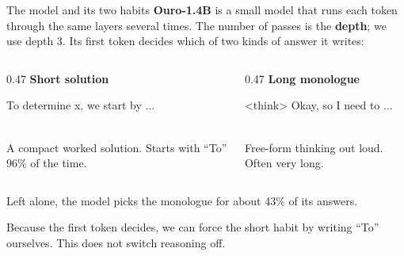 \documentclass[aspectratio=169,11pt]{beamer}
\newcommand{\takeaway}[1]{\par\vfill\begin{center}\colorbox{accent!8}{\parbox{0.9\textwidth}{\centering\small #1}}\end{center}\vspace{0.2em}}
\newcommand{\sample}[2]{%
  \colorbox{#1}{\parbox{0.9\linewidth}{\footnotesize\ttfamily #2}}}
\begin{document}
\begin{frame}{The model and its two habits}
  \small
  \textbf{Ouro-1.4B} is a small model that runs each token through the same layers several times.
  The number of passes is the \textbf{depth}; we use depth 3.
  Its first token decides which of two kinds of answer it writes:
  \vspace{0.5em}
  \begin{columns}[T,onlytextwidth]
    \begin{column}{0.47\textwidth}
      \textbf{Short solution}\\[0.3em]
      \sample{accent!10}{To determine x, we start by ...}\\[0.4em]
      A compact worked solution. Starts with ``To'' 96\% of the time.
    \end{column}
    \begin{column}{0.47\textwidth}
      \textbf{Long monologue}\\[0.3em]
      \sample{g3!12}{<think> Okay, so I need to ...}\\[0.4em]
      Free-form thinking out loud. Often very long.
    \end{column}
  \end{columns}
  \vspace{0.6em}
  Left alone, the model picks the monologue for about 43\% of its answers.
  \takeaway{Because the first token decides, we can force the short habit by writing ``To'' ourselves.
  This does not switch reasoning off.}
\end{frame}
\end{document}
